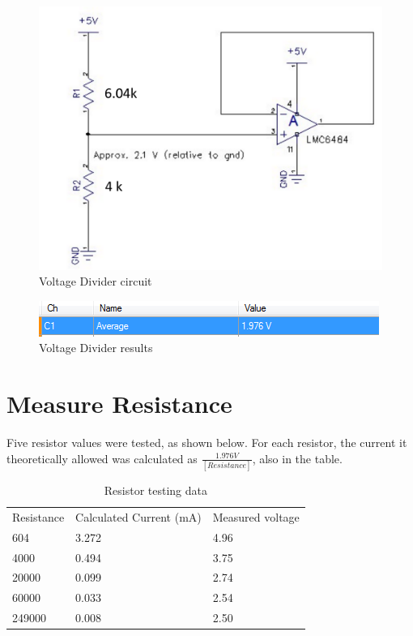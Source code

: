 \documentclass[11pt]{article} %
\begin{document}
\begin{figure}[H]
	\centering
	\includegraphics[width=.7\textwidth]{CD1.PNG}
	\caption{Voltage Divider circuit}
\end{figure}

\begin{figure}[H]
	\centering
	\includegraphics[width=.7\textwidth]{VoltageDivider.png}
	\caption{Voltage Divider results}
 	\label{fig:awesome}
\end{figure}

\section{Measure Resistance}

Five resistor values were tested, as shown below. For each resistor, the current it theoretically allowed was calculated as $\frac {1.976V} {[Resistance]}$, also in the table.
\begin{table}[H]
\centering
\caption{Resistor testing data}
\begin{tabular}{lll}
Resistance & Calculated Current (mA) & Measured voltage \\
604        & 3.272                   & 4.96             \\
4000       & 0.494                   & 3.75             \\
20000      & 0.099                   & 2.74             \\
60000      & 0.033                   & 2.54             \\
249000     & 0.008                   & 2.50            
\end{tabular}
\end{table}
\end{document}
